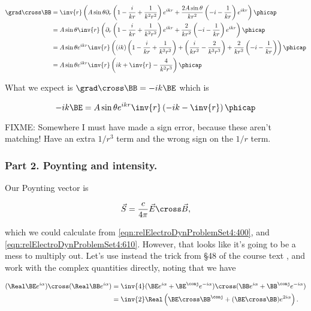 \begin{align*}
\grad \cross \BB 
&=
\inv{r } \left(
 A\sin\theta 
\partial_r \left( 1 - \frac{i}{k r} + \frac{1}{k^2 r^2} \right) e^{i k r} 
+\frac{2 A \sin\theta}{k r^2} 
\left( -i - \frac{1}{kr} \right) e^{i k r} 
\right) \phicap \\
&=
A \sin\theta 
\inv{r } \left(
\partial_r \left( 1 - \frac{i}{k r} + \frac{1}{k^2 r^2} \right) e^{i k r} 
+\frac{2 }{k r^2} 
\left( -i - \frac{1}{kr} \right) e^{i k r} 
\right) \phicap \\
&=
A \sin\theta e^{i k r}
\inv{r } \left(
(ik)\left( 1 - \frac{i}{k r} + \frac{1}{k^2 r^2} \right) 
+\left( \frac{i}{k r^2} - \frac{2}{k^2 r^3} \right) 
+\frac{2 }{k r^2} 
\left( -i - \frac{1}{kr} \right) 
\right) \phicap \\
&=
A \sin\theta e^{i k r}
\inv{r } \left(
i k + \inv{r} - \frac{ 4 }{k^2 r^3}
\right) \phicap \\
\end{align*}

What we expect is $\grad \cross \BB = - i k \BE$ which is

\begin{equation}\label{eqn:relElectroDynProblemSet4:640}
- i k \BE =
A \sin\theta e^{i k r}
\inv{r } \left(
- i k - \inv{r}
\right) \phicap 
\end{equation}

FIXME: Somewhere I must have made a sign error, because these aren't matching!  Have an extra $1/r^3$ term and the wrong sign on the $1/r$ term.

\subsubsection{Part 2.  Poynting and intensity.}

Our Poynting vector is

\begin{equation}\label{eqn:relElectroDynProblemSet4:650}
\vec{S} = \frac{c}{4 \pi} \vec{E} \cross \vec{B},
\end{equation}

which we could calculate from \ref{eqn:relElectroDynProblemSet4:400}, and \ref{eqn:relElectroDynProblemSet4:610}.  However, that looks like it's going to be a mess to multiply out.  Let's use instead the trick from \S 48 of the course text \cite{landau1980classical}, and work with the complex quantities directly, noting that we have

\begin{align*}
(\Real \BE e^{i \alpha}) \cross (\Real \BB e^{i \alpha}) 
&= \inv{4} 
( \BE e^{i \alpha} + \BE^\conj e^{-i \alpha}) \cross ( \BB e^{i \alpha} + \BB^\conj e^{-i \alpha}) \\
&= \inv{2} \Real \left( \BE \cross \BB^\conj + (\BE \cross \BB) e^{2 i \alpha} \right).
\end{align*}

